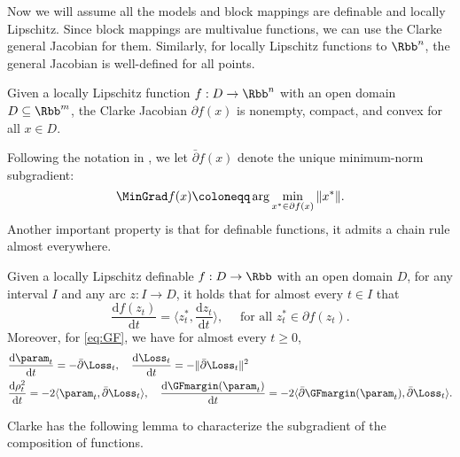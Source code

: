 Now we will assume all the models and block mappings are definable and locally Lipschitz. Since block mappings are multivalue functions, we can use the Clarke general Jacobian for them. Similarly, for locally Lipschitz functions to $\Rbb^n$, the general Jacobian is well-defined for all points.

\begin{corollary}
\label{cor:Clarke Jacobian of locally Lipschitz functions}
Given a locally Lipschitz function $f: D \to \Rbb^n$ with an open domain $D \subseteq \Rbb^m$, the Clarke Jacobian $\partial f(x)$ is nonempty, compact, and convex for all $x \in D$.
\end{corollary}

Following the notation in \citet{ji2020directional}, we let $\bar \partial f(x)$ denote the unique minimum-norm subgradient: 
\begin{equation}
\label{eq:min-norm-sub-grad}
 \MinGrad f(x) \coloneqq \arg\min_{x^* \in \partial f(x)} \|x^*\|.   
\end{equation}
Another important property is that for definable functions, it admits a chain rule almost everywhere. 
\begin{lemma}
\label{lem:chain-rule-clark}
Given a locally Lipschitz definable $f: D \to \Rbb$ with an open domain $D$, for any interval $I$ and any arc $z: I \to D$, it holds that for almost every $t \in I$ that 
\[
    \frac{\mathrm{d} f(z_t)}{ \mathrm{d}  t} = \bigg\langle z_t^*, \frac{\mathrm{d} z_t}{\mathrm{d} t} \bigg\rangle, \quad \text{ for all } z_t^* \in \partial f(z_t).  
\]
Moreover, for \eqref{eq:GF}, we have for almost every $t\ge 0$, 
\begin{align*}
&\frac{\mathrm{d} \param_t}{\mathrm{d}  t} = - \bar \partial \Loss_t, \quad \frac{\mathrm{d}  \Loss_t}{\mathrm{d} t} = - \| \bar \partial \Loss_t \|^2
\\
&\frac{\mathrm{d} \rho_t^2}{\mathrm{d}  t} = -2 \langle \param_t, \bar \partial \Loss_t  \rangle, \quad \frac{\mathrm{d} \GFmargin (\param_t)}{\mathrm{d} t} =    -2 \langle \bar \partial \GFmargin(\param_t), \bar \partial \Loss_t  \rangle.
\end{align*}
\end{lemma}
Clarke has the following lemma to characterize the subgradient of the composition of functions.


